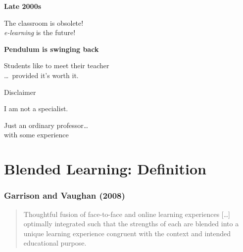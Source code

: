 \begin{frame}
  \begin{center}
    \textbf{Late 2000s}
  \end{center}
  \begin{center}
    The classroom is obsolete! \\
    \emph{e-learning} is the future!
  \end{center}
\end{frame}

\begin{frame}
  \begin{center}
    \textbf{Pendulum is swinging back}
  \end{center}
  \begin{center}
    Students like to meet their teacher \\
    \pause
    \dots\ provided it's worth it.
  \end{center}
\end{frame}

\begin{frame}[standout]
  Disclaimer \\
  \bigskip

  I am not a specialist.

  Just an ordinary professor\dots \\
  with some experience
\end{frame}

\section{Blended Learning: Definition}

\begin{frame}
  \frametitle{Garrison and Vaughan (2008)}

  \begin{quote}
    Thoughtful fusion of face-to-face and online learning
    experiences [\dots] optimally integrated such that the strengths
    of each are blended into a unique learning experience congruent
    with the context and intended educational purpose.
  \end{quote}
\end{frame}


